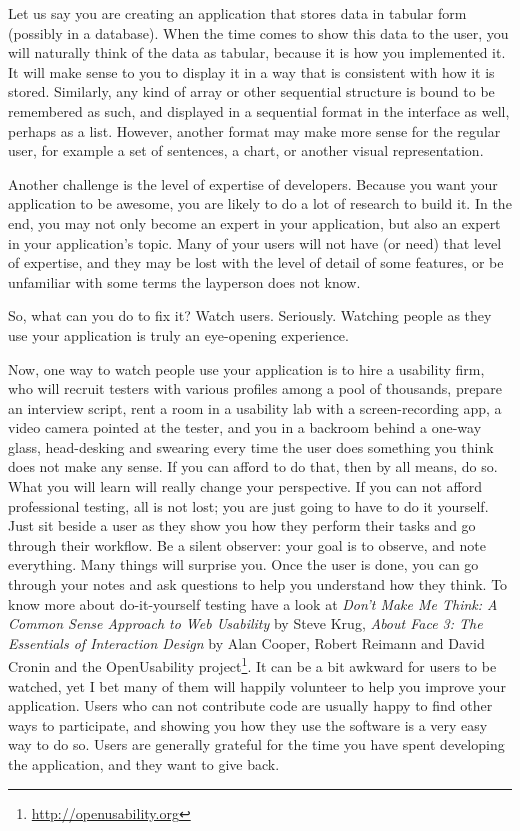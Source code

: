 Let us say you are creating an application that stores data in tabular form
(possibly in a database). When the time comes to show this data to the user, you
will naturally think of the data as tabular, because it is how you implemented
it. It will make sense to you to display it in a way that is consistent with how
it is stored. Similarly, any kind of array or other sequential structure is
bound to be remembered as such, and displayed in a sequential format in the
interface as well, perhaps as a list. However, another format may make more
sense for the regular user, for example a set of sentences, a chart, or another
visual representation.

Another challenge is the level of expertise of developers. Because you want your
application to be awesome, you are likely to do a lot of research to build it.
In the end, you may not only become an expert in your application, but also an
expert in your application's topic. Many of your users will not have (or need)
that level of expertise, and they may be lost with the level of detail of some
features, or be unfamiliar with some terms the layperson does not know.

So, what can you do to fix it? Watch users. Seriously. Watching people as they
use your application is truly an eye-opening experience.

Now, one way to watch people use your application is to hire a usability firm,
who will recruit testers with various profiles among a pool of thousands,
prepare an interview script, rent a room in a usability lab with a
screen-recording app, a video camera pointed at the tester, and you in a
backroom behind a one-way glass, head-desking and swearing every time the user
does something you think does not make any sense. If you can afford to do that,
then by all means, do so. What you will learn will really change your
perspective. If you can not afford professional testing, all is not lost; you
are just going to have to do it yourself. Just sit beside a user as they show
you how they perform their tasks and go through their workflow. Be a silent
observer: your goal is to observe, and note everything. Many things will
surprise you. Once the user is done, you can go through your notes and ask
questions to help you understand how they think. To know more about
do-it-yourself testing have a look at \textit{Don't Make Me Think: A Common
Sense Approach to Web Usability} by Steve Krug, \textit{About Face 3: The
Essentials of Interaction Design} by Alan Cooper, Robert Reimann and David
Cronin and the OpenUsability project\footnote{\url{http://openusability.org}}.
It can be a bit awkward for users to be watched, yet I bet many of them will
happily volunteer to help you improve your application. Users who can not
contribute code are usually happy to find other ways to participate, and showing
you how they use the software is a very easy way to do so. Users are generally
grateful for the time you have spent developing the application, and they want
to give back.

